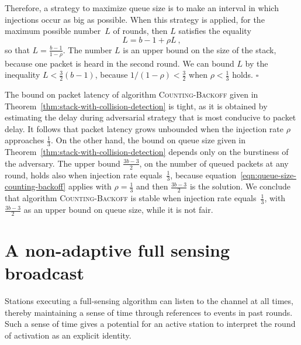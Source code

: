\documentclass[11pt]{article}
\newcommand{\qed}{\hfill $\square$ \smallbreak}
\newenvironment{proof}{\noindent{\bf Proof:}}{\qed}
\begin{document}
\begin{proof}
Therefore, a strategy to maximize queue size is to make an interval in which injections occur as big as possible.
When this strategy is applied, for the maximum possible number~$L$ of rounds, then $L$ satisfies the equality 
\begin{equation}
\label{eqn:queue-size-counting-backoff}
L=b-1 + \rho L
\ , 
\end{equation}
so that $L=\frac{b-1}{1-\rho}$.
The number $ L$ is an upper bound on  the size of the stack, because one packet is heard in the second round.
We can bound $L$ by the inequality $L< \frac{3}{2} (b-1)$, because $1/(1-\rho)<\frac{3}{2}$ when  $\rho<\frac{1}{3}$ holds.
\end{proof} 


The  bound on packet latency of algorithm \textsc{Counting-Backoff} given in Theorem~\ref{thm:stack-with-collision-detection} is tight, as it is obtained by estimating the delay during adversarial strategy that is most conducive to packet delay.
It follows that  packet latency grows unbounded when the injection rate $\rho$ approaches  $\frac{1}{3}$.
On the other hand, the bound on queue size given in Theorem~\ref{thm:stack-with-collision-detection} depends only on the burstiness of the adversary.
The upper bound $\frac{3b-3}{2}$, on the number of queued packets at any round, holds also when injection rate equals~$\frac{1}{3}$, because equation~\eqref{eqn:queue-size-counting-backoff} applies with $\rho=\frac{1}{3}$ and then $\frac{3b-3}{2}$ is the solution.
We conclude that algorithm \textsc{Counting-Backoff} is stable when injection rate equals~$\frac{1}{3}$, with $\frac{3b-3}{2}$ as an upper bound on queue size,  while it is not fair. 



\section{A non-adaptive full sensing broadcast}

\label{sec:full-sensing}



Stations executing a full-sensing algorithm can listen to the channel at all times, thereby maintaining a sense of time through references to events in past rounds.
Such a sense of time gives a potential for an active station to interpret the round of activation as an explicit identity.
\end{document}
